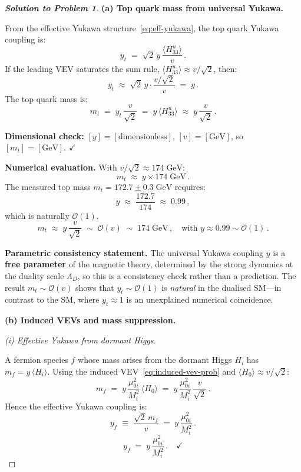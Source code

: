 \documentclass[11pt,a4paper]{article}
\begin{document}
\begin{proof}[\textbf{Solution to Problem 1}]

\textbf{(a) Top quark mass from universal Yukawa.}

From the effective Yukawa structure~\eqref{eq:eff-yukawa}, the top
quark Yukawa coupling is:
\[
  y_t \;=\; \sqrt{2}\,y\, \frac{\langle H_{33}^u \rangle}{v}\,.
\]
If the leading VEV saturates the sum rule,
$\langle H_{33}^u \rangle \approx v/\sqrt{2}$, then:
\[
  y_t \;\approx\; \sqrt{2}\,y \cdot \frac{v/\sqrt{2}}{v} \;=\; y\,.
\]
The top quark mass is:
\[
  m_t \;=\; y_t\, \frac{v}{\sqrt{2}} \;=\; y\,\langle H_{33}^u\rangle
  \;\approx\; y\, \frac{v}{\sqrt{2}}\,.
\]

\textbf{Dimensional check:} $[y] = [\text{dimensionless}]$,
$[v] = [\text{GeV}]$, so $[m_t] = [\text{GeV}]$.
\quad$\checkmark$

\textbf{Numerical evaluation.}  With $v/\sqrt{2} \approx 174\;\text{GeV}$:
\[
  m_t \;\approx\; y \times 174\;\text{GeV}\,.
\]
The measured top mass $m_t = 172.7 \pm 0.3\;\text{GeV}$ requires:
\[
  y \;\approx\; \frac{172.7}{174} \;\approx\; 0.99\,,
\]
which is naturally $\mathcal{O}(1)$.
\[
  \boxed{m_t \;\approx\; y\, \frac{v}{\sqrt{2}} \;\sim\; \mathcal{O}(v)
  \;\sim\; 174\;\text{GeV}\,,
  \quad\text{with } y \approx 0.99 \sim \mathcal{O}(1)\,.}
\]

\textbf{Parametric consistency statement.}
The universal Yukawa coupling $y$ is a
\textbf{free parameter} of the magnetic theory, determined by the
strong dynamics at the duality scale $\Lambda_D$, so this is a
consistency check rather than a prediction.  The result
$m_t \sim \mathcal{O}(v)$ shows that $y_t \sim \mathcal{O}(1)$ is
\emph{natural} in the dualised SM---in contrast to the SM, where
$y_t \approx 1$ is an unexplained numerical coincidence.

\bigskip

\textbf{(b) Induced VEVs and mass suppression.}

\textit{(i) Effective Yukawa from dormant Higgs.}

A fermion species $f$ whose mass arises from the dormant Higgs $H_i$
has $m_f = y\,\langle H_i \rangle$.
Using the induced VEV~\eqref{eq:induced-vev-prob} and
$\langle H_0\rangle \approx v/\sqrt{2}$:
\[
  m_f \;=\; y\, \frac{\mu_{0i}^2}{M_i^2}\, \langle H_0 \rangle
  \;=\; y\, \frac{\mu_{0i}^2}{M_i^2}\, \frac{v}{\sqrt{2}}\,.
\]
Hence the effective Yukawa coupling is:
\[
  y_f \;\equiv\; \frac{\sqrt{2}\,m_f}{v}
  \;=\; y\, \frac{\mu_{0i}^2}{M_i^2}\,.
\]
\[
  \boxed{y_f \;=\; y\, \frac{\mu_{0i}^2}{M_i^2}\,.}
  \quad\checkmark
\]


\end{proof}
\end{document}
